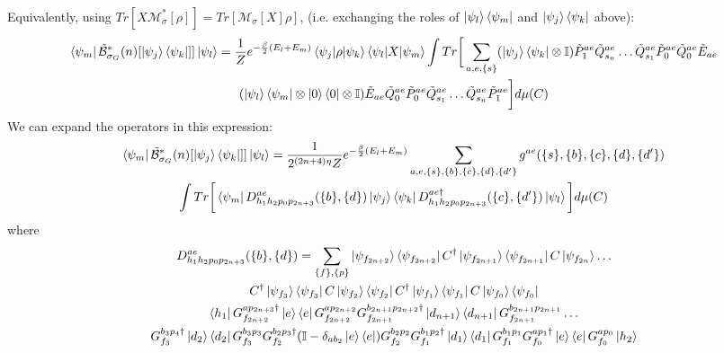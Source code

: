 \documentclass[aps,floatfix,10pt,amssymb,amsfont,amsmath,superscriptaddress,float,nofootinbib,longbibliography,nobalancelastpage,twocolumn]{revtex4-2}
\begin{document}
\begin{widetext}
\begin{multline}
\end{multline}
Equivalently, using $Tr[X\mathcal{M}^*_{\sigma}[\rho]] = Tr[\mathcal{M}_{\sigma}[X]\rho]$, (i.e. exchanging the roles of $\ket{\psi_l}\bra{\psi_m}$ and $\ket{\psi_j}\bra{\psi_k}$ above):
\begin{multline}
       \bra{\psi_m}\tilde{\mathcal{B}}^*_{\sigma_G}(n)[\ket{\psi_j}\bra{\psi_k}]]\ket{\psi_l} = \frac{1}{Z}e^{-\frac{\beta}{2}(E_l+E_m)}\braket{\psi_j|\rho|\psi_k}\braket{\psi_l|X|\psi_m}\int Tr\bigg[ \sum_{a,e,\{s\}}(\ket{\psi_j}\bra{\psi_k}\otimes \mathbb{I})\tilde P^{ae}_1\tilde Q^{ae}_{s_n}\ldots \tilde Q^{ae}_{s_1}\tilde P^{ae}_0\tilde Q^{ae}_0\tilde E_{ae} \\(\ket{\psi_l}\bra{\psi_m}\otimes \ket{0}\bra{0} \otimes \mathbb{I})  \tilde E_{ae}\tilde Q^{ae}_0\tilde P^{ae}_0\tilde Q^{ae}_{s_1}\ldots \tilde Q^{ae}_{s_n}\tilde P^{ae}_1\bigg]d\mu(C)
    \label{eq:Bstarexpanded}
\end{multline}
We can expand the operators in this expression:
\begin{multline}
    \bra{\psi_m}\tilde{\mathcal{B}}^*_{\sigma_G}(n)[\ket{\psi_j}\bra{\psi_k}]]\ket{\psi_l} = \frac{1}{2^{(2n+4)\eta}Z}e^{-\frac{\beta}{2}(E_l+E_m)}\sum_{a,e,\{s\},\{b\},\{c\},\{d\},\{d'\}} g^{ae}(\{s\},\{b\},\{c\},\{d\},\{d'\}) \\\int Tr\bigg[  \bra{\psi_{m}}D_{h_1h_2p_0p_{2n+3}}^{ae}(\{b\},\{d\})\ket{\psi_j}\bra{\psi_k} D_{h_1h_2p_0p_{2n+3}}^{ae\dagger}(\{c\},\{d'\})\ket{\psi_{l}}
  \bigg]d\mu(C) 
\end{multline}
where 
\begin{multline}
    D^{ae}_{h_1h_2p_0p_{2n+3}}(\{b\},\{d\}) = \sum_{\{f\},\{p\}}\ket{\psi_{f_{2n+2}}}\bra{\psi_{f_{2n+2}}}C^{\dagger}\ket{\psi_{f_{2n+1}}}\bra{\psi_{f_{2n+1}}}C\ket{\psi_{f_{2n}}}\ldots \\C^{\dagger}\ket{\psi_{f_3}}\bra{\psi_{f_3}}C\ket{\psi_{f_2}}\bra{\psi_{f_2}}C^{\dagger}\ket{\psi_{f_1}}\bra{\psi_{f_1}}C\ket{\psi_{f_0}}\bra{\psi_{f_0}}
    \\
\bra{h_1}G^{ap_{2n+3}\dagger}_{f_{2n+2}}\ket{e}\bra{e}G^{ap_{2n+2}}_{f_{2n+2}}G^{b_{2n+1}p_{2n+2}\dagger}_{f_{2n+1}}\ket{d_{n+1}}\bra{d_{n+1}}G^{b_{2n+1}p_{2n+1}}_{f_{2n+1}}\ldots\\ G^{b_3p_4\dagger}_{f_3}\ket{d_2}\bra{d_2}G^{b_3p_3}_{f_3}G^{b_2p_3\dagger}_{f_2}(\mathbb{I} - \delta_{ab_2}\ket{e}\bra{e})G^{b_2p_2}_{f_2}G^{b_1p_2\dagger}_{f_1}\ket{d_1}\bra{d_1}G^{b_1p_1}_{f_1}G^{ap_1\dagger}_{f_0}\ket{e}\bra{e}G^{ap_0}_{f_0}\ket{h_2}
\end{multline}

\end{widetext}
\end{document}
